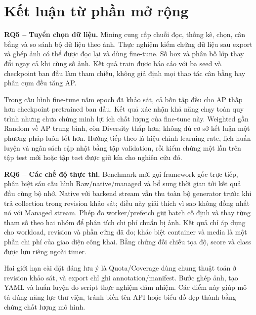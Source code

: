 \section{Kết luận từ phần mở rộng}
\textbf{RQ5 -- Tuyển chọn dữ liệu.} Mining cung cấp chuỗi đọc, thống kê, chọn, cân bằng và so sánh bộ dữ liệu theo ảnh. Thực nghiệm kiểm chứng dữ liệu sau export và ghép ảnh có thể được đọc lại và dùng fine-tune. Số box và phân bố lớp thay đổi ngay cả khi cùng số ảnh. Kết quả train được báo cáo với ba seed và checkpoint ban đầu làm tham chiếu, không giả định mọi thao tác cân bằng hay phân cụm đều tăng AP.

Trong cấu hình fine-tune năm epoch đã khảo sát, cả bốn tập đều cho AP thấp hơn checkpoint pretrained ban đầu. Kết quả xác nhận khả năng chạy toàn quy trình nhưng chưa chứng minh lợi ích chất lượng của fine-tune này. Weighted gần Random về AP trung bình, còn Diversity thấp hơn; không đủ cơ sở kết luận một phương pháp luôn tốt hơn. Hướng tiếp theo là hiệu chỉnh learning rate, lịch huấn luyện và ngân sách cập nhật bằng tập validation, rồi kiểm chứng một lần trên tập test mới hoặc tập test được giữ kín cho nghiên cứu đó.

\textbf{RQ6 -- Các chế độ thực thi.} Benchmark mới gọi framework gốc trực tiếp, phân biệt sáu cấu hình Raw/native/managed và bổ sung thời gian tới kết quả đầu cùng bộ nhớ. Native với backend stream vẫn thu toàn bộ generator trước khi trả collection trong revision khảo sát; điều này giải thích vì sao không đồng nhất nó với Managed stream. Phép đo worker/prefetch giữ batch cố định và thay từng tham số theo hai nhóm để phân tích chi phí chuẩn bị ảnh. Kết quả chỉ áp dụng cho workload, revision và phần cứng đã đo; khác biệt container và media là một phần chi phí của giao diện công khai. Bằng chứng đối chiếu tọa độ, score và class được lưu riêng ngoài timer.

Hai giới hạn cài đặt đáng lưu ý là Quota/Coverage dùng chung thuật toán ở revision khảo sát, và export chỉ ghi annotation/manifest. Bước ghép ảnh, tạo YAML và huấn luyện do script thực nghiệm đảm nhiệm. Các điểm này giúp mô tả đúng năng lực thư viện, tránh biến tên API hoặc biểu đồ đẹp thành bằng chứng chất lượng mô hình.
